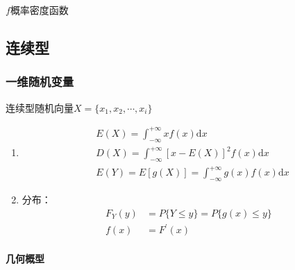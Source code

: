 \documentclass[12pt]{book}
\begin{document}
$f$概率密度函数








\subsection{连续型}


\subsubsection{一维随机变量}


连续型随机向量$X=\{x_1,x_2,\cdots,x_i\}$

\begin{enumerate}[1.]
    \item 
    \begin{align*}
        &E(X) 
        = \int_{-\infty}^{+\infty}{x f(x)\mathrm{d}x}\\
        &D(X) 
        = \int_{-\infty}^{+\infty}{
            [x-E(X)]^2 f(x) \mathrm{d}x
        }  \\
        &E(Y) = E[g(X)] = \int_{-\infty}^{+\infty}{ g(x)f(x)\mathrm{d}x }
    \end{align*}
    \item 分布：
    \begin{align*}
        F_Y(y)&=P\{Y\leqslant y\}
         = P\{g(x)\leqslant y\} \\
        f(x) &= F^\prime(x)
    \end{align*}
\end{enumerate}

\paragraph{几何概型}
\end{document}
